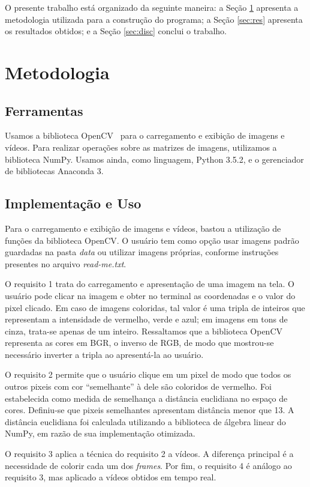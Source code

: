 \documentclass{bmvc2k}
\begin{document}
O presente trabalho está organizado da seguinte maneira: a Seção \ref{sec:met} apresenta a metodologia utilizada para a construção do programa; a Seção \ref{sec:res} apresenta os resultados obtidos; e a Seção \ref{sec:disc} conclui o trabalho.

\section{Metodologia}
\label{sec:met}
\subsection{Ferramentas}
\label{subsec:fer}
Usamos a biblioteca OpenCV~\cite{opencv_library} para o carregamento e exibição de imagens e vídeos. Para realizar operações sobre as matrizes de imagens, utilizamos a biblioteca NumPy. Usamos ainda, como linguagem, Python 3.5.2, e o gerenciador de bibliotecas Anaconda 3.

\subsection{Implementação e Uso}
\label{subsec:imp}
Para o carregamento e exibição de imagens e vídeos, bastou a utilização de funções da biblioteca OpenCV. O usuário tem como opção usar imagens padrão guardadas na pasta \textit{data} ou utilizar imagens próprias, conforme instruções presentes no arquivo \textit{read-me.txt}.

O requisito 1 trata do carregamento e apresentação de uma imagem na tela. O usuário pode clicar na imagem e obter no terminal as coordenadas e o valor do pixel clicado. Em caso de imagens coloridas, tal valor é uma tripla de inteiros que representam a intensidade de vermelho, verde e azul; em imagens em tons de cinza, trata-se apenas de um inteiro. Ressaltamos que a biblioteca OpenCV representa as cores em BGR, o inverso de RGB, de modo que mostrou-se necessário inverter a tripla ao apresentá-la ao usuário.

O requisito 2 permite que o usuário clique em um pixel de modo que todos os outros pixeis com cor ``semelhante'' à dele são coloridos de vermelho. Foi estabelecida como medida de semelhança a distância euclidiana no espaço de cores. Definiu-se que pixeis semelhantes apresentam distância menor que 13. A distância euclidiana foi calculada utilizando a biblioteca de álgebra linear do NumPy, em razão de sua implementação otimizada.

O requisito 3 aplica a técnica do requisito 2 a vídeos. A diferença principal é a necessidade de colorir cada um dos \textit{frames}. Por fim, o requisito 4 é análogo ao requisito 3, mas aplicado a vídeos obtidos em tempo real.
\end{document}
